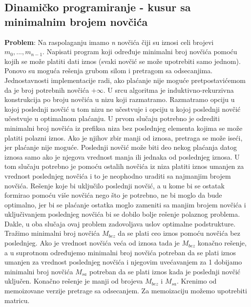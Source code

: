 \documentclass{article}
\begin{document}
\subsection{Dinamičko programiranje - kusur sa minimalnim brojem novčića}
\textbf{Problem}: Na raspolaganju imamo \textit{n} novčića čiji su iznosi celi brojevi
$m_0,..., m_{n-1}$. Napisati program koji određuje minimalni broj novčića pomoću kojih se može platiti dati iznos (svaki novčić se može upotrebiti samo jednom).
\newline
Ponovo su moguća rešenja grubom silom i
pretragom sa odsecanjima. Jednostavnosti implementacije radi, ako
plaćanje nije moguće pretpostavićemom da je broj potrebnih novčića $+\infty$.
\newline
U srcu algoritma je induktivno-rekurzivna konstrukcija po broju novčića u nizu
koji razmatramo. Razmatramo opciju u kojoj poslednji novčić u tom nizu ne
učestvuje i opciju u kojoj poslednji novčić učestvuje u optimalnom plaćanju. U
prvom slučaju potrebno je odrediti minimalni broj novčića iz prefiksa niza bez
poslednjeg elementa kojima se može platiti polazni iznos. Ako je njihov zbir manji od iznosa, pretraga se može
iseći, jer plaćanje nije moguće. Poslednji novčić može biti deo nekog plaćanja
datog iznosa samo ako je njegova vrednost manja ili jednaka od poslednjeg iznosa.
U tom slučaju potrebno je pomoću ostalih novčića iz niza platiti iznos umanjen
za vrednost poslednjeg novčića i to je neophodno uraditi sa najmanjim brojem
novčića. Rešenje koje bi uključilo poslednji
novčić, a u kome bi se ostatak formirao pomoću više novčića nego što je potrebno,
ne bi moglo da bude optimalno, jer bi se plaćanje ostatka moglo zameniti sa
manjim brojem novčića i uključivanjem poslednjeg novčića bi se dobilo bolje
rešenje polaznog problema. Dakle, u oba slučaja ovaj problem zadovoljava uslov
optimalne podstrukture. Tražimo minimalni broj novčića $M_{bez}$ da se plati ceo
iznos pomoću novčića bez poslednjeg. Ako je vrednost novčića veća od iznosa
tada je $M_{bez}$ konačno rešenje, a u suprotnom određujemo minimalni broj novčića
potreban da se plati iznos umanjen za vrednost poslednjeg novčića i njegovim
uvećavanjem za 1 dobijamo minimalni broj novčića $M_{sa}$ potreban da se plati
iznos kada je poslednji novčić uključen. Konačno rešenje je manji od brojeva
$M_{bez}$ i $M_{sa}$.
\newline
Krenimo od
memoizovane verzije pretrage sa odsecanjem. Za memoizaciju možemo upotrebiti
matricu. 
\end{document}
